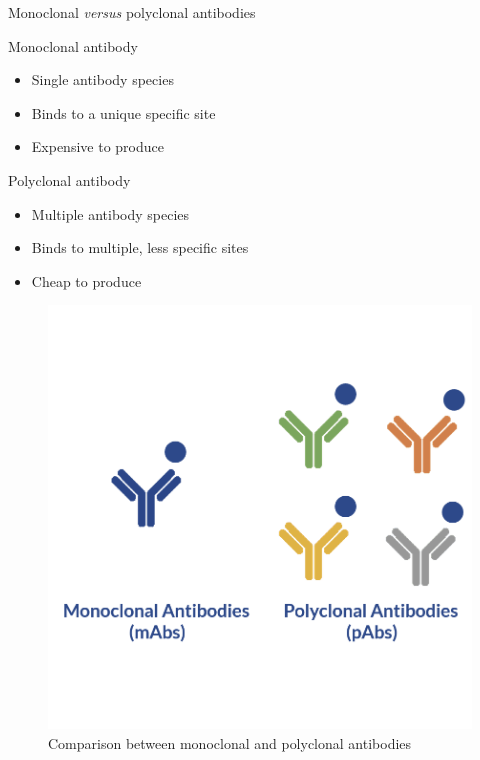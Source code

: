 \begin{frame}{Monoclonal \textit{versus} polyclonal antibodies}
    \begin{minipage}{0.5\textwidth}
        \begin{block}{Monoclonal antibody}

            \begin{itemize}
                \item Single antibody species
                \item Binds to a unique specific site
                \item Expensive to produce
            \end{itemize}
        \end{block}

        \begin{block}{Polyclonal antibody}
            \begin{itemize}
                \item Multiple antibody species
                \item Binds to multiple, less specific sites
                \item Cheap to produce
            \end{itemize}
        \end{block}
    \end{minipage}\hfill
    \begin{minipage}{0.45\textwidth}
        \begin{figure}
            \centering
        \includegraphics[width=\textwidth]{../Images/schematics_mono_poly.png}
        \caption{Comparison between monoclonal and polyclonal antibodies}
        \end{figure}    
    \end{minipage}
\end{frame}